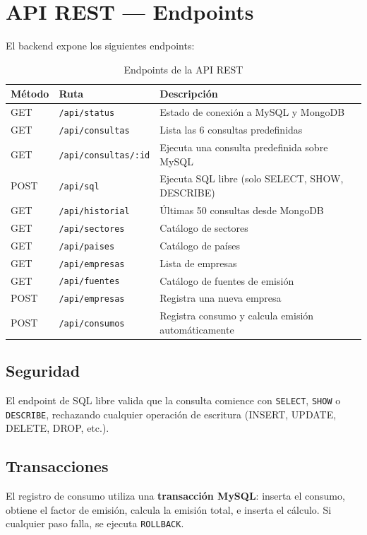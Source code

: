 \documentclass[12pt, a4paper]{article}
\begin{document}
\section{API REST --- Endpoints}
El backend expone los siguientes endpoints:
\begin{table}[H]
\centering
\small
\begin{tabular}{@{}llp{6.5cm}@{}}
\toprule
\textbf{Método} & \textbf{Ruta} & \textbf{Descripción} \\
\midrule
GET  & \texttt{/api/status}         & Estado de conexión a MySQL y MongoDB \\
GET  & \texttt{/api/consultas}      & Lista las 6 consultas predefinidas \\
GET  & \texttt{/api/consultas/:id}  & Ejecuta una consulta predefinida sobre MySQL \\
POST & \texttt{/api/sql}            & Ejecuta SQL libre (solo SELECT, SHOW, DESCRIBE) \\
GET  & \texttt{/api/historial}      & Últimas 50 consultas desde MongoDB \\
GET  & \texttt{/api/sectores}       & Catálogo de sectores \\
GET  & \texttt{/api/paises}         & Catálogo de países \\
GET  & \texttt{/api/empresas}       & Lista de empresas \\
GET  & \texttt{/api/fuentes}        & Catálogo de fuentes de emisión \\
POST & \texttt{/api/empresas}       & Registra una nueva empresa \\
POST & \texttt{/api/consumos}       & Registra consumo y calcula emisión automáticamente \\
\bottomrule
\end{tabular}
\caption{Endpoints de la API REST}
\end{table}
\subsection{Seguridad}
El endpoint de SQL libre valida que la consulta comience con \texttt{SELECT}, \texttt{SHOW} o \texttt{DESCRIBE}, rechazando cualquier operación de escritura (INSERT, UPDATE, DELETE, DROP, etc.).
\subsection{Transacciones}
El registro de consumo utiliza una \textbf{transacción MySQL}: inserta el consumo, obtiene el factor de emisión, calcula la emisión total, e inserta el cálculo. Si cualquier paso falla, se ejecuta \texttt{ROLLBACK}.
\end{document}
